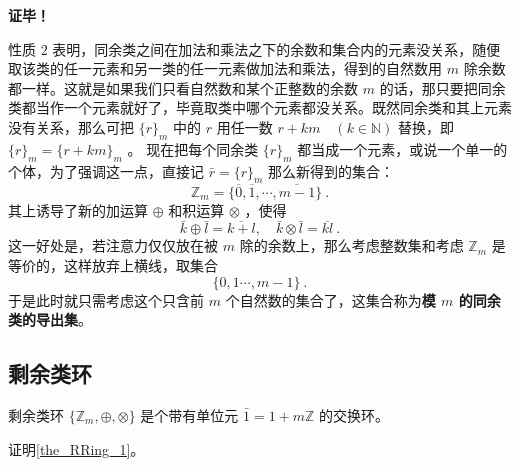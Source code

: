 \textbf{证毕！}

性质 $2$ 表明，同余类之间在加法和乘法之下的余数和集合内的元素没关系，随便取该类的任一元素和另一类的任一元素做加法和乘法，得到的自然数用 $m$ 除余数都一样。这就是如果我们只看自然数和某个正整数的余数 $m$ 的话，那只要把同余类都当作一个元素就好了，毕竟取类中哪个元素都没关系。既然同余类和其上元素没有关系，那么可把 $\{r\}_m$ 中的 $r$ 用任一数 $r+k m \quad(k \in \mathbb{N})$ 替换，即 $\{r\}_m=\{r+k m\}_m$ 。
现在把每个同余类 $\{r\}_m$ 都当成一个元素，或说一个单一的个体，为了强调这一点，直接记 $\bar{r}=\{r\}_m$ 那么新得到的集合：
\begin{equation}
\mathbb{Z}_m=\{\overline{0}, \overline{1}, \cdots, \overline{m-1}\}~.
\end{equation}
其上诱导了新的加运算 $\oplus$ 和积运算 $\otimes$ ，使得
\begin{equation}
\bar{k} \oplus \bar{l}=\overline{k+l}, \quad \bar{k} \otimes \bar{l}=\overline{k l}~.
\end{equation}
这一好处是，若注意力仅仅放在被 $m$ 除的余数上，那么考虑整数集和考虑 $\mathbb{Z}_m$ 是等价的，这样放弃上横线，取集合
$$
\{0,1 \cdots, m-1\}~.
$$
于是此时就只需考虑这个只含前 $m$ 个自然数的集合了，这集合称为\textbf{模 $m$ 的同余类的导出集}。
\subsection{剩余类环}
\begin{theorem}{剩余类环}\label{the_RRing_1}
$\{\mathbb Z_m,\oplus,\otimes\}$ 是个带有单位元 $\bar 1=1+m\mathbb Z$ 的交换环。
\end{theorem}
\begin{exercise}{}
证明\autoref{the_RRing_1}。
\end{exercise}